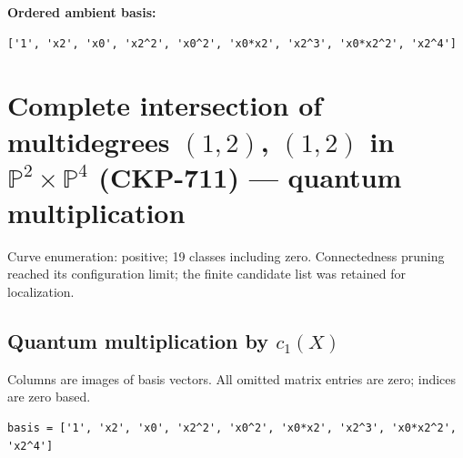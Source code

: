 \documentclass[10pt,a4paper]{article}
\begin{document}
\textbf{Ordered ambient basis:}
\begin{lstlisting}
['1', 'x2', 'x0', 'x2^2', 'x0^2', 'x0*x2', 'x2^3', 'x0*x2^2', 'x2^4']
\end{lstlisting}

\clearpage\section*{Complete intersection of multidegrees $(1,2)$, $(1,2)$ in $\mathbb P^{2}\times \mathbb P^{4}$ (CKP-711) --- quantum multiplication}

Curve enumeration: positive; 19 classes including zero.
Connectedness pruning reached its configuration limit; the finite candidate list was retained for localization.
\subsection*{Quantum multiplication by $c_1(X)$}
Columns are images of basis vectors. All omitted matrix entries are zero; indices are zero based.

\begin{lstlisting}
basis = ['1', 'x2', 'x0', 'x2^2', 'x0^2', 'x0*x2', 'x2^3', 'x0*x2^2', 'x2^4']
\end{lstlisting}
\end{document}
